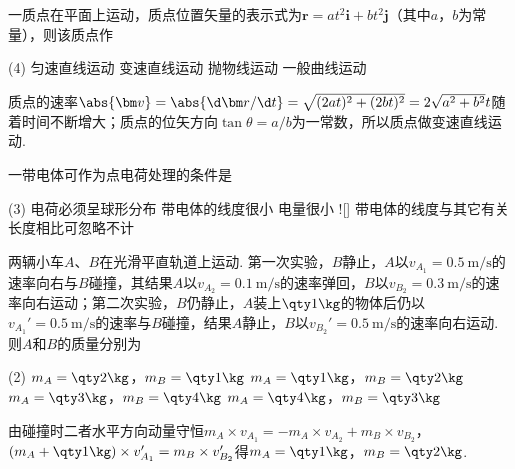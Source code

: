 \begin{problem}
    一质点在平面上运动，质点位置矢量的表示式为$\bm r=at^2\bm i+bt^2\bm j$（其中$a$，$b$为常量），则该质点作
    \begin{tasks}(4)
        \task 匀速直线运动
        \task[\true] 变速直线运动
        \task 抛物线运动
        \task 一般曲线运动
    \end{tasks}
\end{problem}
\begin{solution}
    质点的速率$\abs{\bm v}=\abs{\d\bm r/\d t}=\sqrt{(2at)^2+(2bt)^2}=2\sqrt{a^2+b^2}t$随着时间不断增大；质点的位矢方向$\tan{\theta}=a/b$为一常数，所以质点做变速直线运动.
\end{solution}

\begin{problem}
    一带电体可作为点电荷处理的条件是
    \begin{tasks}(3)
        \task 电荷必须呈球形分布
        \task 带电体的线度很小
        \task 电量很小
        \task![\true] 带电体的线度与其它有关长度相比可忽略不计
    \end{tasks}
\end{problem}

\begin{problem}
    两辆小车$A$、$B$在光滑平直轨道上运动. 第一次实验，$B$静止，$A$以$v_{A_1}=\qty{0.5}{\m/\s}$的速率向右与$B$碰撞，其结果$A$以$v_{A_2}=\qty{0.1}{\m/\s}$的速率弹回，$B$以$v_{B_2}=\qty{0.3}{\m/\s}$的速率向右运动；第二次实验，$B$仍静止，$A$装上$\qty1\kg$的物体后仍以$v_{A_1}'=\qty{0.5}{\m/\s}$的速率与$B$碰撞，结果$A$静止，$B$以$v_{B_2}'=\qty{0.5}{\m/\s}$的速率向右运动. 则$A$和$B$的质量分别为
    \begin{tasks}(2)
        \task $m_A=\qty2\kg$，$m_B=\qty1\kg$
        \task[\true] $m_A=\qty1\kg$，$m_B=\qty2\kg$
        \task $m_A=\qty3\kg$，$m_B=\qty4\kg$
        \task $m_A=\qty4\kg$，$m_B=\qty3\kg$
    \end{tasks}
\end{problem}
\begin{solution}
    由碰撞时二者水平方向动量守恒$m_A\times v_{A_1}=-m_A\times v_{A_2}+m_B\times v_{B_2}$，$(m_A+\qty1\kg)\times v_{A_1}'=m_B\times v_{B_2}'$得$m_A=\qty1\kg$，$m_B=\qty2\kg$.
\end{solution}

